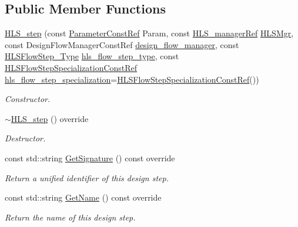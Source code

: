 \subsection*{Public Member Functions}
\begin{DoxyCompactItemize}
\item 
\hyperlink{classHLS__step_a1c137d0b686b327d00e906ef2f3b1cae}{H\+L\+S\+\_\+step} (const \hyperlink{Parameter_8hpp_a37841774a6fcb479b597fdf8955eb4ea}{Parameter\+Const\+Ref} Param, const \hyperlink{hls__manager_8hpp_acd3842b8589fe52c08fc0b2fcc813bfe}{H\+L\+S\+\_\+manager\+Ref} \hyperlink{classHLS__step_ade85003a99d34134418451ddc46a18e9}{H\+L\+S\+Mgr}, const Design\+Flow\+Manager\+Const\+Ref \hyperlink{classDesignFlowStep_ab770677ddf087613add30024e16a5554}{design\+\_\+flow\+\_\+manager}, const \hyperlink{hls__step_8hpp_ada16bc22905016180e26fc7e39537f8d}{H\+L\+S\+Flow\+Step\+\_\+\+Type} \hyperlink{classHLS__step_aefd59af15346ec3f10bf12bd756e6777}{hls\+\_\+flow\+\_\+step\+\_\+type}, const \hyperlink{hls__step_8hpp_a5fdd2edf290c196531d21d68e13f0e74}{H\+L\+S\+Flow\+Step\+Specialization\+Const\+Ref} \hyperlink{classHLS__step_a843be75ba53b81876aa3c8b870ae8a55}{hls\+\_\+flow\+\_\+step\+\_\+specialization}=\hyperlink{hls__step_8hpp_a5fdd2edf290c196531d21d68e13f0e74}{H\+L\+S\+Flow\+Step\+Specialization\+Const\+Ref}())
\begin{DoxyCompactList}\small\item\em Constructor. \end{DoxyCompactList}\item 
\hyperlink{classHLS__step_a2e2ee25d502e48f0766f538f23def09b}{$\sim$\+H\+L\+S\+\_\+step} () override
\begin{DoxyCompactList}\small\item\em Destructor. \end{DoxyCompactList}\item 
const std\+::string \hyperlink{classHLS__step_a93c15724812bc99bccd3c57bcb680295}{Get\+Signature} () const override
\begin{DoxyCompactList}\small\item\em Return a unified identifier of this design step. \end{DoxyCompactList}\item 
const std\+::string \hyperlink{classHLS__step_aa60ee88fc2b3b180e118e8dee44f4044}{Get\+Name} () const override
\begin{DoxyCompactList}\small\item\em Return the name of this design step. \end{DoxyCompactList}\item 

\end{DoxyCompactItemize}
